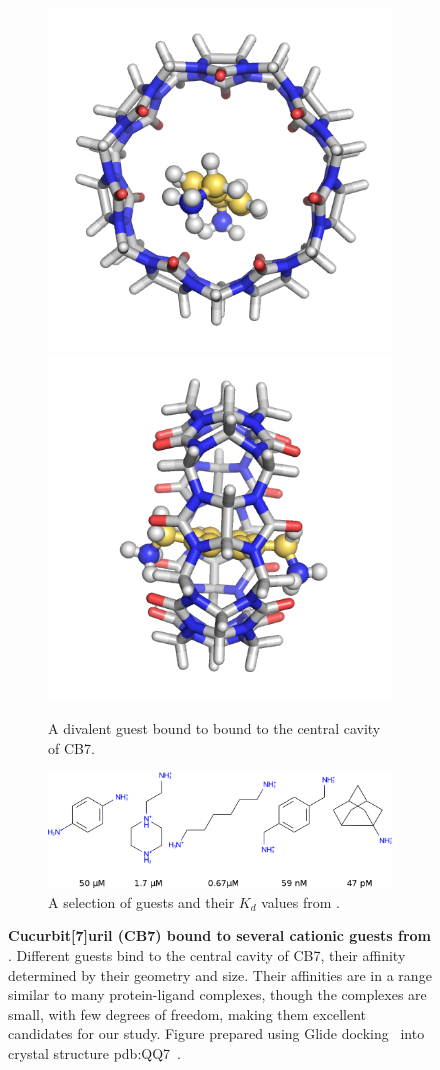 \documentclass[10pt,final]{article}
\begin{document}
\begin{figure}[H]
\centering
\begin{subfigure}{.5\textwidth}
  \centering
  \includegraphics[width=.4\linewidth]{figures/guest11_top.png}
  \includegraphics[width=.4\linewidth]{figures/guest11_side.png}
  \caption{A divalent guest bound to bound to the central cavity of CB7.}
  \label{fig:sub1}
\end{subfigure}%
\begin{subfigure}{.5\textwidth}
  \centering
  \includegraphics[width=1\linewidth]{figures/Kd_guest2.png}  
  \caption{A selection of guests and their $K_d$ values from \textcite{Cao2013a}.}
  \label{fig:sub2}
\end{subfigure}
\caption{\textbf{Cucurbit[7]uril (CB7) bound to several cationic guests from \textcite{Cao2013a}}. Different guests bind to the central cavity of CB7, their affinity determined by their geometry and size. Their affinities are in a range similar to many protein-ligand complexes, though the complexes are small, with few degrees of freedom, making them excellent candidates for our study. Figure prepared using Glide docking~\autocite{Halgren2004a,Friesner2004a,Friesner2006a,Schroedinger2014a} into crystal structure pdb:QQ7~\autocite{Feng2004a}.}
\label{figure:host-guest}
\end{figure}
\end{document}
